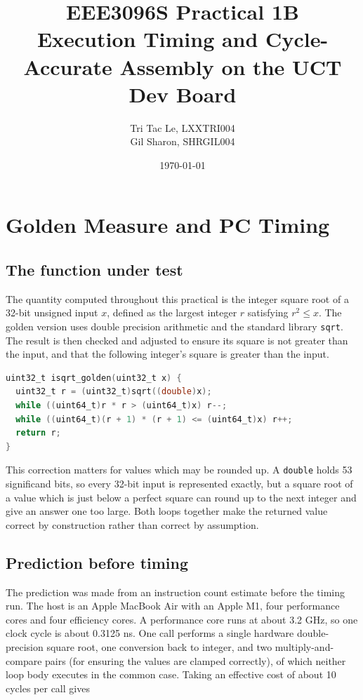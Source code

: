 \documentclass[11pt]{article}
\title{\textbf{EEE3096S Practical 1B} \\ Execution Timing and Cycle-Accurate Assembly on the UCT Dev Board}
\author{Tri Tac Le, LXXTRI004 \\ Gil Sharon, SHRGIL004}
\date{\today}
\begin{document}
\maketitle

\section{Golden Measure and PC Timing}

\subsection{The function under test}

The quantity computed throughout this practical is the integer square root of a
32-bit unsigned input $x$, defined as the largest integer $r$ satisfying
$r^2 \le x$. The golden version uses double precision arithmetic and the
standard library \texttt{sqrt}. The result is then checked and adjusted to ensure its square is not greater than the input, and that the following integer's square is greater than the input. 

\begin{lstlisting}[language=C]
uint32_t isqrt_golden(uint32_t x) {
  uint32_t r = (uint32_t)sqrt((double)x);
  while ((uint64_t)r * r > (uint64_t)x) r--;
  while ((uint64_t)(r + 1) * (r + 1) <= (uint64_t)x) r++;
  return r;
}
\end{lstlisting}
\noindent
This correction matters for values which may be rounded up. A \texttt{double} holds 53 significand bits,
so every 32-bit input is represented exactly, but a square root of a value which is just below a perfect square can round up to the next integer and give an answer one too large. Both loops together make the returned value correct by construction
rather than correct by assumption.

\subsection{Prediction before timing}

The prediction was made from an instruction count estimate before the timing
run. The host is an Apple MacBook Air with an Apple M1, four
performance cores and four efficiency cores. A performance core runs at about
3.2 GHz, so one clock cycle is about 0.3125 ns.
\noindent
One call performs a single hardware double-precision square root, one
conversion back to integer, and two multiply-and-compare pairs (for ensuring the values are clamped correctly),
of which neither loop body executes in the common case. Taking an effective
cost of about 10 cycles per call gives
\end{document}
